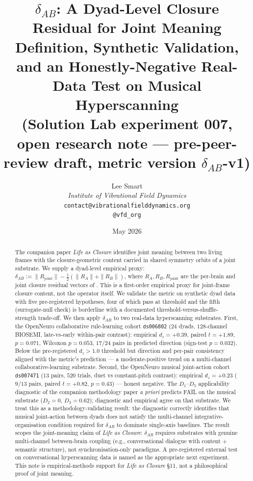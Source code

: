 \documentclass[11pt,a4paper]{article}
\title{\textbf{$\delta_{AB}$: A Dyad-Level Closure Residual for Joint Meaning}\\[2pt]
\large Definition, Synthetic Validation, and an Honestly-Negative Real-Data Test on Musical Hyperscanning\\[1pt]
\small (Solution Lab experiment 007, open research note --- pre-peer-review draft, metric version $\delta_{AB}$-v1)}
\author{%
  Lee Smart\\[4pt]
  \textit{Institute of Vibrational Field Dynamics}\\[2pt]
  \texttt{contact@vibrationalfielddynamics.org}\\[2pt]
  \texttt{@vfd\_org}%
}
\date{May 2026}
\begin{document}
\maketitle
\thispagestyle{empty}

\begin{abstract}
\noindent
The companion paper \emph{Life as Closure} \citep{SmartLifeAsClosure} identifies joint meaning between two living frames with the closure-geometric content carried in shared symmetry orbits of a joint substrate. We supply a dyad-level empirical proxy: $\delta_{AB} := \|R_{\mathrm{joint}}\| - \tfrac{1}{2}(\|R_A\| + \|R_B\|)$, where $R_A, R_B, R_{\mathrm{joint}}$ are the per-brain and joint closure residual vectors of \citet{SolutionLab002}. This is a first-order empirical proxy for joint-frame closure content, not the operator itself. We validate the metric on synthetic dyad data with five pre-registered hypotheses, four of which pass at threshold and the fifth (surrogate-null check) is borderline with a documented threshold-versus-shuffle-strength trade-off. We then apply $\delta_{AB}$ to two real-data hyperscanning substrates. First, the OpenNeuro collaborative rule-learning cohort \texttt{ds006802} \citep{MoerelCollab2026} ($24$ dyads, $128$-channel BIOSEMI, late-vs-early within-pair contrast): empirical $d_z = +0.39$, paired $t = +1.89$, $p = 0.071$, Wilcoxon $p = 0.053$, $17/24$ pairs in predicted direction (sign-test $p = 0.032$). Below the pre-registered $d_z > 1.0$ threshold but direction and per-pair consistency aligned with the metric's prediction --- a moderate-positive trend on a multi-channel collaborative-learning substrate. Second, the OpenNeuro musical joint-action cohort \texttt{ds007471} \citep{ZhouHyperscanning2026} ($13$ pairs, $520$ trials, duet vs constant-pitch contrast): empirical $d_z = +0.23$ ($9/13$ pairs, paired $t = +0.82$, $p = 0.43$) --- honest negative. The $D_1$--$D_5$ applicability diagnostic of the companion methodology paper \citep{SmartClosureDistance} \emph{a priori} predicts FAIL on the musical substrate ($D_2 = 0$, $D_3 = 0.62$); diagnostic and empirical agree on that substrate. We treat this as a methodology-validating result: the diagnostic correctly identifies that musical joint-action between dyads does not satisfy the multi-channel integrative-organisation condition required for $\delta_{AB}$ to dominate single-axis baselines. The result scopes the joint-meaning claim of \emph{Life as Closure}: $\delta_{AB}$ requires substrates with genuine multi-channel between-brain coupling (e.g., conversational dialogue with content + semantic structure), not synchronisation-only paradigms. A pre-registered external test on conversational hyperscanning data is named as the appropriate next experiment. This note is empirical-methods support for \emph{Life as Closure} \S 11, not a philosophical proof of joint meaning.
\end{abstract}
\end{document}

